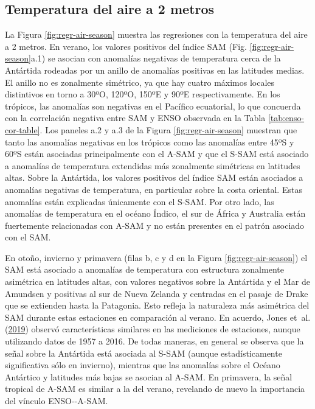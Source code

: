 \documentclass[12pt,oneside,a4paper]{reedthesis}
\begin{document}
\hypertarget{temperatura-del-aire-a-2-metros}{%
\subsection{Temperatura del aire a 2 metros}\label{temperatura-del-aire-a-2-metros}}

La Figura \ref{fig:regr-air-season} muestra las regresiones con la temperatura del aire a 2 metros.
En verano, los valores positivos del índice SAM (Fig. \ref{fig:regr-air-season}a.1) se asocian con anomalías negativas de temperatura cerca de la Antártida rodeadas por un anillo de anomalías positivas en las latitudes medias.
El anillo no es zonalmente simétrico, ya que hay cuatro máximos locales distintivos en torno a 30ºO, 120ºO, 150ºE y 90ºE respectivamente.
En los trópicos, las anomalías son negativas en el Pacífico ecuatorial, lo que concuerda con la correlación negativa entre SAM y ENSO observada en la Tabla \ref{tab:enso-cor-table}.
Los paneles a.2 y a.3 de la Figura \ref{fig:regr-air-season} muestran que tanto las anomalías negativas en los trópicos como las anomalías entre 45ºS y 60ºS están asociadas principalmente con el A-SAM y que el S-SAM está asociado a anomalías de temperatura extendidas más zonalmente simétricas en latitudes altas.
Sobre la Antártida, los valores positivos del índice SAM están asociados a anomalías negativas de temperatura, en particular sobre la costa oriental.
Estas anomalías están explicadas únicamente con el S-SAM.
Por otro lado, las anomalías de temperatura en el océano Índico, el sur de África y Australia están fuertemente relacionadas con A-SAM y no están presentes en el patrón asociado con el SAM.

En otoño, invierno y primavera (filas b, c y d en la Figura \ref{fig:regr-air-season}) el SAM está asociado a anomalías de temperatura con estructura zonalmente asimétrica en latitudes altas, con valores negativos sobre la Antártida y el Mar de Amundsen y positivas al sur de Nueva Zelanda y centradas en el pasaje de Drake que se extienden hasta la Patagonia.
Esto refleja la naturaleza más asimétrica del SAM durante estas estaciones en comparación al verano.
En acuerdo, Jones et~al. (\protect\hyperlink{ref-jones2019}{2019}) observó características similares en las mediciones de estaciones, aunque utilizando datos de 1957 a 2016.
De todas maneras, en general se observa que la señal sobre la Antártida está asociada al S-SAM (aunque estadísticamente significativa sólo en invierno), mientras que las anomalías sobre el Océano Antártico y latitudes más bajas se asocian al A-SAM.
En primavera, la señal tropical de A-SAM es similar a la del verano, revelando de nuevo la importancia del vínculo ENSO-\/-A-SAM.
\end{document}
